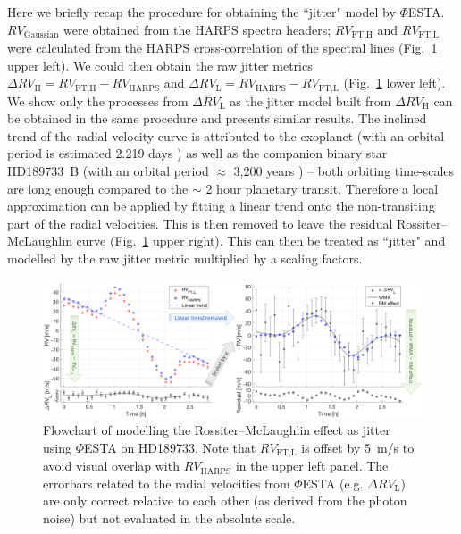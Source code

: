 Here we briefly recap the procedure for obtaining the ``jitter" model by $\mathit{\Phi}$ESTA. $RV_\text{Gaussian}$ were obtained from the HARPS spectra headers; $RV_\text{FT,H}$ and $RV_\text{FT,L}$ were calculated from the HARPS cross-correlation of the spectral lines (Fig.~\ref{fig:HD189733} upper left). We could then obtain the raw jitter metrics $\Delta RV_\text{H} = RV_\text{FT,H} - RV_\text{HARPS}$ and $\Delta RV_\text{L} = RV_\text{HARPS} - RV_\text{FT,L}$ (Fig.~\ref{fig:HD189733} lower left). We show only the processes from $\Delta RV_\text{L}$ as the jitter model built from $\Delta RV_\text{H}$ can be obtained in the same procedure and presents similar results. The inclined trend of the radial velocity curve is attributed to the exoplanet (with an orbital period is estimated 2.219 days \cite{Bouchy2005ELODIE}) as well as the companion binary star HD189733~B (with an orbital period $\approx$ 3,200 years \cite{Bakos2006}) -- both orbiting time-scales are long enough compared to the $\sim$ 2 hour planetary transit. Therefore a local approximation can be applied by fitting a linear trend onto the non-transiting part of the radial velocities. This is then removed to leave the residual Rossiter–McLaughlin curve (Fig.~\ref{fig:HD189733} upper right). This can then be treated as ``jitter" and modelled by the raw jitter metric multiplied by a scaling factors. 

\begin{figure}[tbp]
\centering
\includegraphics[width = 1.0 \linewidth]
{./Figures/Methods/HD189733.png}
\caption[HD189733: modelling Rossiter–McLaughlin effect as jitter]
		{Flowchart of modelling the Rossiter–McLaughlin effect as jitter using $\mathit{\Phi}$ESTA on HD189733. Note that $RV_\text{FT,L}$ is offset by 5~m/s to avoid visual overlap with $RV_\text{HARPS}$ in the upper left panel. The errorbars related to the radial velocities from $\mathit{\Phi}$ESTA (e.g. $\Delta RV_\text{L}$) are only correct relative to each other (as derived from the photon noise) but not evaluated in the absolute scale.}
\label{fig:HD189733}
\end{figure} 

